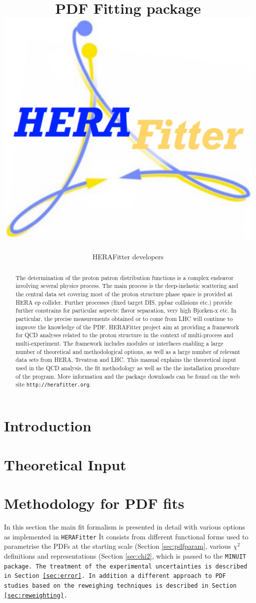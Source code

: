 \documentclass[11pt,twoside,a4paper]{article}
\title{ \vspace{1cm} {\Huge \fitter\ } \\
              PDF Fitting package  \\ 
              \vspace{0.5cm}
\includegraphics[width=0.25\linewidth]{figures/logo.pdf}}
\author{HERAFitter developers}
\newcommand\fitter{ \mbox{\tt HERAFitter} }
\begin{document}
\maketitle
\vspace{4cm}
\begin{abstract}
\vspace{0.5cm}
The determination of the  proton patron distribution functions is a complex endeavor involving several physics process. The main process is the deep-inelastic scattering and the central  data set covering most of the proton structure phase space is provided at HERA ep collider. Further processes (fixed target DIS, ppbar collisions etc.) provide further constrains for particular aspects: flavor separation, very high Bjorken-x etc. In particular, the precise measurements obtained or to come from LHC will continue to improve the knowledge of the PDF. HERAFitter project aim at providing a framework for QCD analyses related to the proton structure in the context of multi-process and multi-experiment. The framework includes modules or interfaces enabling a large number of theoretical and methodological options, as well as a large number of relevant data sets from HERA, Tevatron and LHC. This manual explains the theoretical input used in the QCD analysis, the fit  methodology as well as the  the installation procedure of the program. More information and the package downloads can be found on the web site {\tt http://herafitter.org}.
\end{abstract}
\thispagestyle{empty}
\newpage
\tableofcontents
\linenumbers
\newpage
\section{Introduction}
  
\section{Theoretical Input}


\section{Methodology for PDF fits}
In this section the main fit formalism is presented in detail with various options as implemented in \fitter\. It consists from different functional forms used to parametrise the PDFs at the starting scale (Section \ref{sec:pdfparam}, various $\chi^2$ definitions and representations (Section \ref{sec:chi2}, which is passed to the \tt MINUIT \rm package. The treatment of the experimental uncertainties is described in Section \ref{sec:error}. In addition a different approach to PDF studies based on the reweighing techniques is described in Section \ref{sec:reweighting}.
\end{document}
